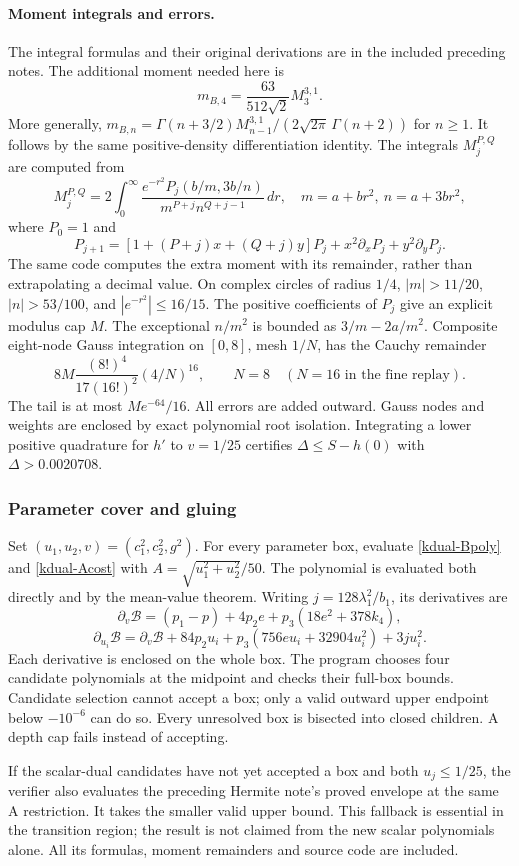 \paragraph{Moment integrals and errors.}
The integral formulas and their original derivations are in the included
preceding notes. The additional moment needed here is
\[
m_{B,4}=\frac{63}{512\sqrt2}M_3^{3,1}.
\]
More generally, $m_{B,n}=\Gamma(n+3/2)M_{n-1}^{3,1}/
(2\sqrt{2\pi}\,\Gamma(n+2))$ for $n\ge1$.
It follows by the same positive-density differentiation identity.
The integrals $M_j^{P,Q}$ are computed from
\[
M_j^{P,Q}=2\int_0^\infty
\frac{e^{-r^2}P_j(b/m,3b/n)}{m^{P+j}n^{Q+j-1}}\,d r,
\quad m=a+br^2,\ n=a+3br^2,
\]
where $P_0=1$ and
\[
P_{j+1}=[1+(P+j)x+(Q+j)y]P_j+x^2\partial_xP_j+y^2\partial_yP_j.
\]
The same code computes the extra moment with its remainder, rather than
extrapolating a decimal value. On complex circles of radius $1/4$,
$|m|>11/20$, $|n|>53/100$, and $|e^{-r^2}|\le16/15$.
The positive coefficients of $P_j$ give an explicit modulus cap $M$.
The exceptional $n/m^2$ is bounded as $3/m-2a/m^2$.
Composite eight-node Gauss integration on $[0,8]$, mesh $1/N$, has
the Cauchy remainder
\[
8M\frac{(8!)^4}{17(16!)^2}(4/N)^{16},\qquad N=8
\quad(N=16\text{ in the fine replay}).
\]
The tail is at most $Me^{-64}/16$. All errors are added outward.
Gauss nodes and weights are enclosed by exact polynomial root isolation.
Integrating a lower positive quadrature for $h'$ to $v=1/25$ certifies
$\Delta\le S-h(0)$ with $\Delta>0.0020708$.

\subsubsection{Parameter cover and gluing}
Set $(u_1,u_2,v)=(c_1^2,c_2^2,g^2)$. For every parameter box, evaluate
\eqref{kdual-Bpoly} and \eqref{kdual-Acost} with
$A=\sqrt{u_1^2+u_2^2}/50$.
The polynomial is evaluated both directly and by the mean-value theorem.
Writing $j=128\lambda_1^2/b_1$, its derivatives are
\[
\partial_v\mathcal B=(p_1-p)+4p_2e+p_3(18e^2+378k_4),
\]
\[
\partial_{u_i}\mathcal B=\partial_v\mathcal B+84p_2u_i+
p_3(756eu_i+32904u_i^2)+3ju_i^2.
\]
Each derivative is enclosed on the whole box. The program chooses four
candidate polynomials at the midpoint and checks their full-box bounds.
Candidate selection cannot accept a box; only a valid outward upper
endpoint below $-10^{-6}$ can do so. Every unresolved box is bisected
into closed children. A depth cap fails instead of accepting.

If the scalar-dual candidates have not yet accepted a box and both
$u_j\le1/25$, the verifier also evaluates the preceding Hermite note's
proved envelope at the same A restriction. It takes the smaller valid
upper bound. This fallback is essential in the transition region;
the result is not claimed from the new scalar polynomials alone.
All its formulas, moment remainders and source code are included.

